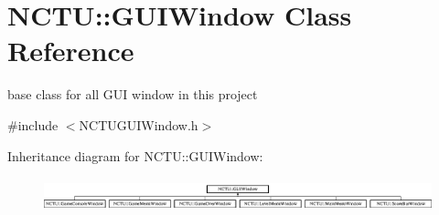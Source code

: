 \hypertarget{class_n_c_t_u_1_1_g_u_i_window}{}\section{N\+C\+TU\+:\+:G\+U\+I\+Window Class Reference}
\label{class_n_c_t_u_1_1_g_u_i_window}


base class for all G\+UI window in this project  




{\ttfamily \#include $<$N\+C\+T\+U\+G\+U\+I\+Window.\+h$>$}

Inheritance diagram for N\+C\+TU\+:\+:G\+U\+I\+Window\+:\begin{figure}[H]
\begin{center}
\leavevmode
\includegraphics[height=1.031308cm]{class_n_c_t_u_1_1_g_u_i_window}
\end{center}
\end{figure}
